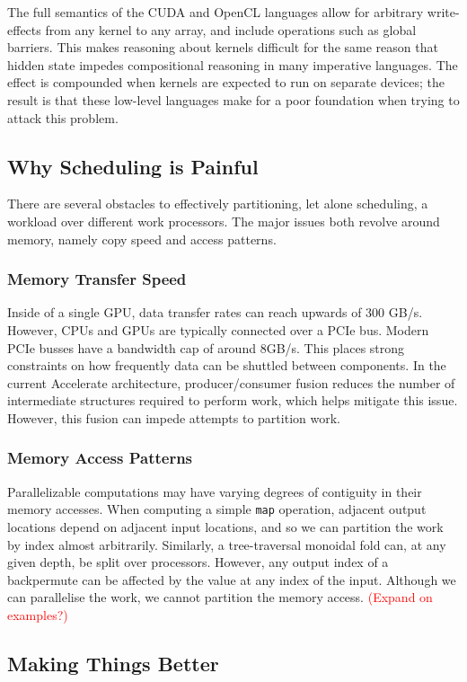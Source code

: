 \documentclass[a4paper,12pt]{article}
\newcommand{\red}[1]{\textcolor{red}{#1}}
\begin{document}
The full semantics of the CUDA and OpenCL languages allow for arbitrary write-effects from any kernel to any array, and include operations such as global barriers. 
This makes reasoning about kernels difficult for the same reason that hidden state impedes compositional reasoning in many imperative languages. 
The effect is compounded when kernels are expected to run on separate devices; the result is that these low-level languages make for a poor foundation when trying to attack this problem.

\subsection{Why Scheduling is Painful}
There are several obstacles to effectively partitioning, let alone scheduling, a workload over different work processors. 
The major issues both revolve around memory, namely copy speed and access patterns. 

\subsubsection*{Memory Transfer Speed} 
Inside of a single GPU, data transfer rates can reach upwards of 300 GB/s. \citep{gtx-780-spec}
However, CPUs and GPUs are typically connected over a PCIe bus.
Modern PCIe busses have a bandwidth cap of around 8GB/s. \citep{pcie-3-faq}
This places strong constraints on how frequently data can be shuttled between components. 
In the current Accelerate architecture, producer/consumer fusion reduces the number of intermediate structures required to perform work, which helps mitigate this issue. 
However, this fusion can impede attempts to partition work.

\subsubsection*{Memory Access Patterns} 
Parallelizable computations may have varying degrees of contiguity in their memory accesses. 
When computing a simple \texttt{map} operation, adjacent output locations depend on adjacent input locations, and so we can partition the work by index almost arbitrarily. 
Similarly, a tree-traversal monoidal fold can, at any given depth, be split over processors. 
However, any output index of a backpermute can be affected by the value at any index of the input. 
Although we can parallelise the work, we cannot partition the memory access. \red{(Expand on examples?)}

\subsection{Making Things Better}
\end{document}
